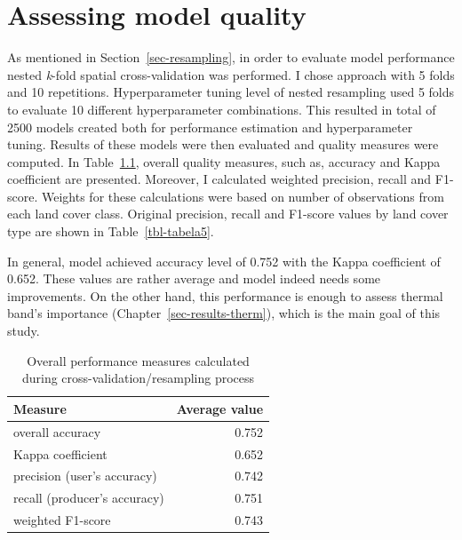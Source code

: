 \documentclass{amuthesis}
\begin{document}

\hypertarget{sec-results-eval}{%
\chapter{Assessing model quality}\label{sec-results-eval}}

As mentioned in Section~\ref{sec-resampling}, in order to evaluate model
performance nested \emph{k}-fold spatial cross-validation was performed.
I chose approach with 5 folds and 10 repetitions. Hyperparameter tuning
level of nested resampling used 5 folds to evaluate 10 different
hyperparameter combinations. This resulted in total of 2500 models
created both for performance estimation and hyperparameter tuning.
Results of these models were then evaluated and quality measures were
computed. In Table~\ref{tbl-tabela4}, overall quality measures, such as,
accuracy and Kappa coefficient are presented. Moreover, I calculated
weighted precision, recall and F1-score. Weights for these calculations
were based on number of observations from each land cover class.
Original precision, recall and F1-score values by land cover type are
shown in Table~\ref{tbl-tabela5}.

In general, model achieved accuracy level of 0.752 with the Kappa
coefficient of 0.652. These values are rather average and model indeed
needs some improvements. On the other hand, this performance is enough
to assess thermal band's importance (Chapter~\ref{sec-results-therm}),
which is the main goal of this study.

\hypertarget{tbl-tabela4}{}
\begin{table}
\caption{\label{tbl-tabela4}Overall performance measures calculated during
cross-validation/resampling process }\tabularnewline

\centering
\begin{tabular}{|>{}l|>{}r|}
\toprule
\textbf{Measure} & \textbf{Average value}\\
\midrule
overall accuracy & 0.752\\
\hline
Kappa coefficient & 0.652\\
\hline
precision (user's accuracy) & 0.742\\
\hline
recall (producer's accuracy) & 0.751\\
\hline
weighted F1-score & 0.743\\
\bottomrule
\end{tabular}
\end{table}
\end{document}
